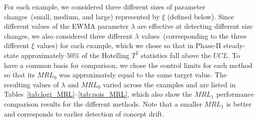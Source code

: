 \documentclass[twoside,11pt]{article}
\begin{document}
\begin{appendices}

For each example, we considered three different sizes of parameter changes~(small, medium, and large) represented by $\xi$ (defined below). Since different values of the EWMA parameter $\lambda$ are effective at detecting different size changes, we also considered three different $\lambda$ values~(corresponding to the three different $\xi$ values) for each example, which we chose so that in Phase-II steady-state approximately $50\%$ of the Hotelling $T^2$ statistics fall above the $UCL$. To have a common basis for comparison, we chose the control limits for each method so that its $MRL_0$ was approximately equal to the same target value. The resulting values of $\lambda$ and $MRL_0$ varied across the examples and are listed in Tables~{\ref{tab:logi_MRL}--\ref{tab:pois_MRL}}, which also show the $MRL_1$ performance comparison results for the different methods. Note that a smaller $MRL_1$ is better and corresponds to earlier detection of concept drift. 


\end{appendices}
\end{document}
